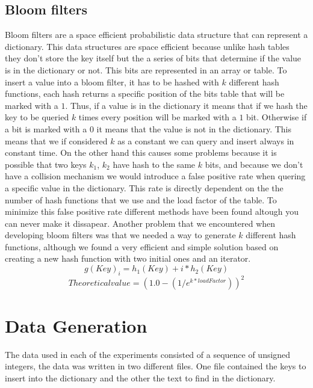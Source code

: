 \documentclass{article}
\begin{document}
    \subsection{Bloom filters}
    Bloom filters \cite{ARTICLE:4} are a space efficient probabilistic data structure that can represent a dictionary. This data structures are space efficient because 
    unlike hash tables they don't store the key itself but the a series of bits that determine if the value is in the dictionary or not. This bits are represented in an array 
    or table. To insert a value into a bloom filter, it has to be hashed with $k$ different hash functions, each hash returns a specific position of the bits table that will be 
    marked with a $1$. Thus, if a value is in the dictionary it means that if we hash the key to be queried $k$ times every position will be marked with a $1$ bit. Otherwise 
    if a bit is marked with a $0$ it means that the value is not in the dictionary. This means that we if considered $k$ as a constant we can query and insert always in constant time. 
    On the other hand this causes some problems because it is possible that two keys $k_1$, $k_2$ have hash to the same $k$ bits, and because we don't have a collision mechanism we would introduce 
    a false positive rate when quering a specific value in the dictionary. This rate is directly dependent on the the number of hash functions that we use and the load factor of the table. 
    To minimize \cite{ARTICLE:1} this false positive rate different methods have been found altough you can never make it dissapear. Another problem that we encountered when developing bloom filters 
    was that we needed a way to generate $k$ different hash functions, although we found a very efficient and simple solution \cite{ARTICLE:3} based on creating a new hash function with two initial ones and 
    an iterator. 
    \begin{equation}
    g(Key)_i = h_1(Key) + i * h_2(Key)
    \end{equation}
    \begin{equation}
    Theoretical value = (1.0 - (1 / e^{k * loadFactor}))^2
    \end{equation}
    
    
    
    \section{Data Generation}
        The data used in each of the experiments consisted of a sequence of unsigned integers,  
        the data was written in two different files. One file contained the keys to insert into the dictionary and the other the text to find in the dictionary. 
       
\end{document}
